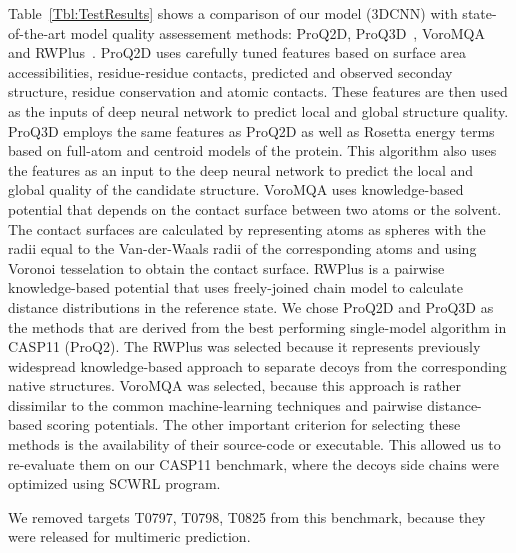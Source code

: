Table~\ref{Tbl:TestResults} shows a comparison of our model (3DCNN)
with state-of-the-art model quality assessement methods: ProQ2D,
ProQ3D~\cite{uziela2017proq3d}, VoroMQA~\cite{olechnovivc2017voromqa}
and RWPlus~\cite{zhang2010novel}.
ProQ2D uses carefully tuned features based on surface area accessibilities, residue-residue contacts, 
predicted and observed seconday structure, residue conservation and atomic contacts. These features are 
then used as the inputs of deep neural network to predict local and global structure quality. 
ProQ3D employs the same features as ProQ2D as well as Rosetta energy terms based on full-atom and centroid models of the protein. 
This algorithm also uses the features as an input to the deep neural network to predict the 
local and global quality of the candidate structure.
VoroMQA uses knowledge-based potential that depends on the contact surface between two atoms or the solvent. The contact surfaces are calculated 
by representing atoms as spheres with the radii equal to the Van-der-Waals radii of the corresponding atoms and using Voronoi tesselation to obtain 
the contact surface. 
RWPlus is a pairwise knowledge-based potential that uses freely-joined chain model to calculate distance distributions in the reference state.
We chose ProQ2D and ProQ3D as the methods that are derived from the best performing single-model algorithm in CASP11 (ProQ2). The RWPlus 
was selected because it represents previously widespread knowledge-based approach to separate decoys from the corresponding native structures.
VoroMQA was selected, because this approach is rather dissimilar to the common machine-learning techniques and pairwise distance-based scoring potentials.
The other important criterion for selecting these methods is the availability of their source-code or executable. This allowed us to re-evaluate them on 
our CASP11 benchmark, where the decoys side chains were optimized using SCWRL program.


We removed targets T0797, T0798, T0825 from this benchmark, because they were released for multimeric prediction.

